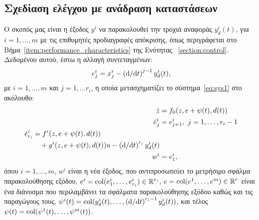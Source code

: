 \subsection{Σχεδίαση ελέγχου με ανάδραση καταστάσεων}
Ο σκοπός μας είναι η έξοδος $y^i$ να παρακολουθεί την τροχιά αναφοράς $y_d^i(t)$, για $i = 1,\ldots, m$ με τις επιθυμητές προδιαγραφές απόκρισης, όπως περιγράφεται στο Βήμα~\ref{item:performance_characteristics} της Ενότητας ~\ref{section:control}. Δεδομένου αυτού, έστω η αλλαγή συντεταγμένων:
\begin{equation*}
    e_j^i = x_j^i - \left(\mathrm{d}/ \mathrm{d} t \right)^{j-1}y_d^i(t),
\end{equation*}
με $i = 1, \ldots, m$ και $j = 1, \ldots r_i$, η οποία μετασχηματίζει το σύστημα~\eqref{eq:sys1} στο ακόλουθο:
\begin{subequations}
    \label{eq:sys2}
    \begin{align}
        \dot z &= f_0(z, e + \psi(t), d(t))\\
        \dot e_j^i &= e_{j+1}^i,\ j = 1,\ldots,r_i-1\\
        \begin{split}
            \dot e_{r_i}^i & = f^i(z,e + \psi(t),d(t)) \\
                &\quad+ g^i(z,e + \psi(t),d(t))u - \left(\mathrm{d}/ \mathrm{d} t \right)^{r_i} y_d^i(t)
        \end{split}\\
        w^i &= e_1^i,
    \end{align}
\end{subequations}
όπου $i = 1, \ldots, m$, $w^i$ είναι η νέα έξοδος, που αντιπροσωπεύει το μετρήσιμο σφάλμα παρακολούθησης εξόδου, $e^i = \operatorname{col}(e_1^i, \ldots, e_{r_i}^i) \in \mathbb{R}^{r_i}$, $e = \operatorname{col}(e^1, \ldots, e^m) \in \mathbb{R}^r$ είναι ένα διάνυσμα που περιλαμβάνει τα σφάλματα παρακολούθησης εξόδου καθώς και τις παραγώγους τους, $\psi^i(t) = \operatorname{col}( y_d^i(t), \ldots, \left(\mathrm{d}/ \mathrm{d} t \right)^{r_i-1} y_d^i(t))$, και τέλος $\psi(t) = \operatorname{col}(\psi^1(t), \ldots, \psi^m(t))$. %

